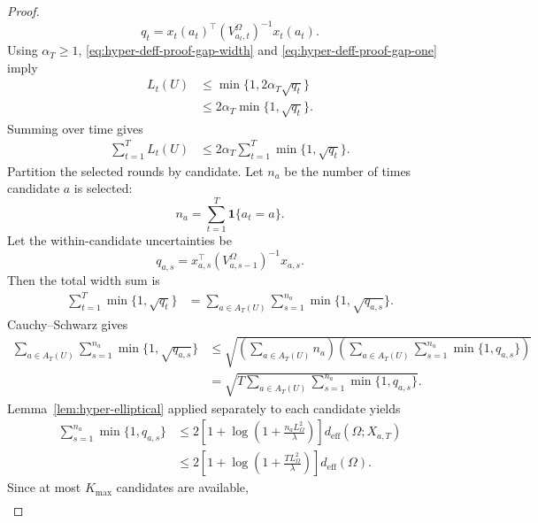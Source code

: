\documentclass{article} %
\begin{document}
\begin{proof}
\begin{equation}
q_t
=
x_t(a_t)^\top
\left(V_{a_t,t}^{\Omega}\right)^{-1}
x_t(a_t).
\end{equation}
Using \(\alpha_T\ge1\), \eqref{eq:hyper-deff-proof-gap-width} and \eqref{eq:hyper-deff-proof-gap-one} imply
\begin{align}
\label{eq:hyper-deff-proof-minwidth}
L_t(U)
&\le
\min\{1,2\alpha_T\sqrt{q_t}\}
\\
&\le
2\alpha_T\min\{1,\sqrt{q_t}\}.
\end{align}
Summing over time gives
\begin{align}
\label{eq:hyper-deff-proof-sum-gap}
\sum_{t=1}^{T}L_t(U)
&\le
2\alpha_T
\sum_{t=1}^{T}
\min\{1,\sqrt{q_t}\}.
\end{align}
Partition the selected rounds by candidate.  Let \(n_a\) be the number of times candidate \(a\) is selected:
\begin{equation}
\label{eq:hyper-deff-proof-na}
n_a
=
\sum_{t=1}^{T}\mathbf{1}\{a_t=a\}.
\end{equation}
Let the within-candidate uncertainties be
\begin{equation}
\label{eq:hyper-deff-proof-qas}
q_{a,s}
=
x_{a,s}^\top
\left(V_{a,s-1}^{\Omega}\right)^{-1}
x_{a,s}.
\end{equation}
Then the total width sum is
\begin{align}
\label{eq:hyper-deff-proof-partition}
\sum_{t=1}^{T}
\min\{1,\sqrt{q_t}\}
&=
\sum_{a\in A_T(U)}
\sum_{s=1}^{n_a}
\min\{1,\sqrt{q_{a,s}}\}.
\end{align}
Cauchy--Schwarz gives
\begin{align}
\label{eq:hyper-deff-proof-cauchy}
\sum_{a\in A_T(U)}
\sum_{s=1}^{n_a}
\min\{1,\sqrt{q_{a,s}}\}
&\le
\sqrt{
\left(
\sum_{a\in A_T(U)}n_a
\right)
\left(
\sum_{a\in A_T(U)}
\sum_{s=1}^{n_a}
\min\{1,q_{a,s}\}
\right)
}
\\
&=
\sqrt{
T
\sum_{a\in A_T(U)}
\sum_{s=1}^{n_a}
\min\{1,q_{a,s}\}
}.
\end{align}
Lemma~\ref{lem:hyper-elliptical} applied separately to each candidate yields
\begin{align}
\label{eq:hyper-deff-proof-elliptical-per-arm}
\sum_{s=1}^{n_a}
\min\{1,q_{a,s}\}
&\le
2
\left[
1+\log\!\left(1+\frac{n_aL_{\Omega}^{2}}{\lambda}\right)
\right]
d_{\mathrm{eff}}(\Omega;X_{a,T})
\\
&\le
2
\left[
1+\log\!\left(1+\frac{TL_{\Omega}^{2}}{\lambda}\right)
\right]
d_{\mathrm{eff}}(\Omega).
\end{align}
Since at most \(K_{\max}\) candidates are available,
\begin{align}

\end{align}
\end{proof}
\end{document}

